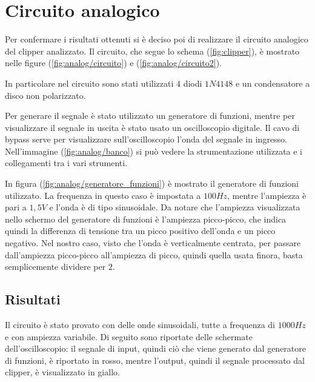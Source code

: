 \chapter{Circuito analogico}
	Per confermare i risultati ottenuti si è deciso poi di realizzare il circuito analogico del clipper analizzato. Il circuito, che segue lo schema (\ref{fig:clipper}), è mostrato nelle figure (\ref{fig:analog/circuito}) e (\ref{fig:analog/circuito2}).
	
	
	In particolare nel circuito sono stati utilizzati $4$ diodi $1N4148$ e un condensatore a disco non polarizzato.
	
	Per generare il segnale è stato utilizzato un generatore di funzioni, mentre per visualizzare il segnale in uscita è stato usato un oscilloscopio digitale. Il cavo di bypass serve per visualizzare sull'oscilloscopio l'onda del segnale in ingresso. Nell'immagine (\ref{fig:analog/banco}) si può vedere la strumentazione utilizzata e i collegamenti tra i vari strumenti.
	
	In figura (\ref{fig:analog/generatore_funzioni}) è mostrato il generatore di funzioni utilizzato. La frequenza in questo caso è impostata a $100Hz$, mentre l'ampiezza è pari a $1,5V$ e l'onda è di tipo sinusoidale. Da notare che l'ampiezza visualizzata nello schermo del generatore di funzioni è l'ampiezza picco-picco, che indica quindi la differenza di tensione tra un picco positivo dell'onda e un picco negativo. Nel nostro caso, visto che l'onda è verticalmente centrata, per passare dall'ampiezza picco-picco all'ampiezza di picco, quindi quella usata finora, basta semplicemente dividere per $2$.
	
	
	\section{Risultati}
		Il circuito è stato provato con delle onde sinusoidali, tutte a frequenza di $1000Hz$ e con ampiezza variabile. Di seguito sono riportate delle schermate dell'oscilloscopio: il segnale di \textcolor{red!90!black}{input}, quindi ciò che viene generato dal generatore di funzioni, è riportato in \textcolor{red!90!black}{rosso}, mentre l'\textcolor{yellow!90!black}{output}, quindi il segnale processato dal clipper, è visualizzato in \textcolor{yellow!90!black}{giallo}.
				
		\pagebreak
		\vspace*{-30px}
		\pagebreak
